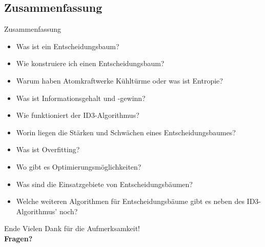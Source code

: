 \subsection{Zusammenfassung}
\begin{frame}{Zusammenfassung}
\begin{itemize}[<+->]
    \item Was ist ein Entscheidungsbaum?
    \item Wie konstruiere ich einen Entscheidungsbaum?
    \item Warum haben Atomkraftwerke Kühltürme oder was ist Entropie?
    \item Was ist Informationsgehalt und -gewinn?
    \item Wie funktioniert der ID3-Algorithmus?
    \item Worin liegen die Stärken und Schwächen eines Entscheidungsbaumes?
    \item Was ist Overfitting?
    \item Wo gibt es Optimierungsmöglichkeiten?
    \item Was sind die Einsatzgebiete von Entscheidungsbäumen?
    \item Welche weiteren Algorithmen für Entscheidungsbäume gibt es neben des ID3-Algorithmus' noch?
    
\end{itemize}


\end{frame}


\begin{frame}{Ende}
\centering
Vielen Dank für die Aufmerksamkeit! \\[3em]
\textbf{Fragen?}
\end{frame}





%
%    
%    
%
% 
%    
%


